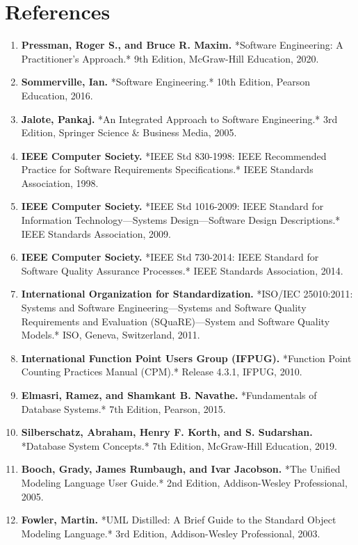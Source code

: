 \documentclass[12pt,a4paper,oneside]{report}
\begin{document}
\section{References}

\begin{enumerate}
  \item \textbf{Pressman, Roger S., and Bruce R. Maxim.} *Software Engineering: A Practitioner's Approach.* 9th Edition, McGraw-Hill Education, 2020.
  \item \textbf{Sommerville, Ian.} *Software Engineering.* 10th Edition, Pearson Education, 2016.
  \item \textbf{Jalote, Pankaj.} *An Integrated Approach to Software Engineering.* 3rd Edition, Springer Science \& Business Media, 2005.
  \item \textbf{IEEE Computer Society.} *IEEE Std 830-1998: IEEE Recommended Practice for Software Requirements Specifications.* IEEE Standards Association, 1998.
  \item \textbf{IEEE Computer Society.} *IEEE Std 1016-2009: IEEE Standard for Information Technology—Systems Design—Software Design Descriptions.* IEEE Standards Association, 2009.
  \item \textbf{IEEE Computer Society.} *IEEE Std 730-2014: IEEE Standard for Software Quality Assurance Processes.* IEEE Standards Association, 2014.
  \item \textbf{International Organization for Standardization.} *ISO/IEC 25010:2011: Systems and Software Engineering—Systems and Software Quality Requirements and Evaluation (SQuaRE)—System and Software Quality Models.* ISO, Geneva, Switzerland, 2011.
  \item \textbf{International Function Point Users Group (IFPUG).} *Function Point Counting Practices Manual (CPM).* Release 4.3.1, IFPUG, 2010.
  \item \textbf{Elmasri, Ramez, and Shamkant B. Navathe.} *Fundamentals of Database Systems.* 7th Edition, Pearson, 2015.
  \item \textbf{Silberschatz, Abraham, Henry F. Korth, and S. Sudarshan.} *Database System Concepts.* 7th Edition, McGraw-Hill Education, 2019.
  \item \textbf{Booch, Grady, James Rumbaugh, and Ivar Jacobson.} *The Unified Modeling Language User Guide.* 2nd Edition, Addison-Wesley Professional, 2005.
  \item \textbf{Fowler, Martin.} *UML Distilled: A Brief Guide to the Standard Object Modeling Language.* 3rd Edition, Addison-Wesley Professional, 2003.
\end{enumerate}
\end{document}

